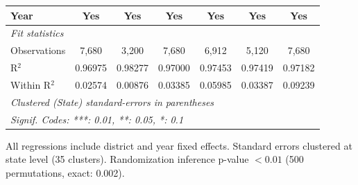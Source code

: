 \begin{table}[htbp]
\begin{tabular}{lcccccc}
      Year                                             & Yes           & Yes          & Yes            & Yes            & Yes            & Yes\\  
      \midrule
      \emph{Fit statistics}\\
      Observations                                     & 7,680         & 3,200        & 7,680          & 6,912          & 5,120          & 7,680\\  
      R$^2$                                            & 0.96975       & 0.98277      & 0.97000        & 0.97453        & 0.97419        & 0.97182\\  
      Within R$^2$                                     & 0.02574       & 0.00876      & 0.03385        & 0.05985        & 0.03387        & 0.09239\\  
      \midrule \midrule
      \multicolumn{7}{l}{\emph{Clustered (State) standard-errors in parentheses}}\\
      \multicolumn{7}{l}{\emph{Signif. Codes: ***: 0.01, **: 0.05, *: 0.1}}\\
   \end{tabular}
   
   \par \raggedright 
   All regressions include district and year fixed effects. Standard errors clustered at state level (35 clusters). Randomization inference p-value $< 0.01$ (500 permutations, exact: 0.002).
\end{table}



